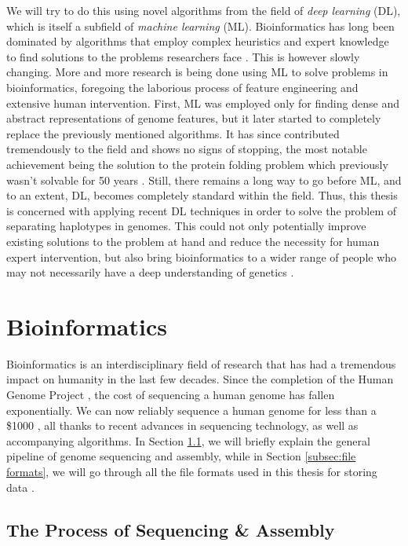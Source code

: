 \documentclass[times, utf8, diplomski, english]{fer_eng}
\begin{document}
We will try to do this using novel algorithms from the field of \textit{deep learning} (DL), which is itself a subfield of \textit{machine learning} (ML). Bioinformatics has long been dominated by algorithms that employ complex heuristics and expert knowledge to find solutions to the problems researchers face \cite{compeau_pevzner_2015}. This is however slowly changing. More and more research is being done using ML to solve problems in bioinformatics, foregoing the laborious process of feature engineering and extensive human intervention. First, ML was employed only for finding dense and abstract representations of genome features, but it later started to completely replace the previously mentioned algorithms. It has since contributed tremendously to the field and shows no signs of stopping, the most notable achievement being the solution to the protein folding problem which previously wasn't solvable for 50 years \cite{alphafold}. Still, there remains a long way to go before ML, and to an extent, DL, becomes completely standard within the field. Thus, this thesis is concerned with applying recent DL techniques in order to solve the problem of separating haplotypes in genomes. This could not only potentially improve existing solutions to the problem at hand and reduce the necessity for human expert intervention, but also bring bioinformatics to a wider range of people who may not necessarily have a deep understanding of genetics \cite{dl_bioinformatics}.

\section{Bioinformatics}

Bioinformatics is an interdisciplinary field of research that has had a tremendous impact on humanity in the last few decades. Since the completion of the Human Genome Project \cite{HGP1} \cite{HGP2}, the cost of sequencing a human genome has fallen exponentially. We can now reliably sequence a human genome for less than a \$1000 \cite{genome_cost}, all thanks to recent advances in sequencing technology, as well as accompanying algorithms. In Section \ref{subsec:the process of sequencing and assembly}, we will briefly explain the general pipeline of genome sequencing and assembly, while in Section \ref{subsec:file formats}, we will go through all the file formats used in this thesis for storing data	.

\subsection{The Process of Sequencing \& Assembly}
\label{subsec:the process of sequencing and assembly}
\end{document}

